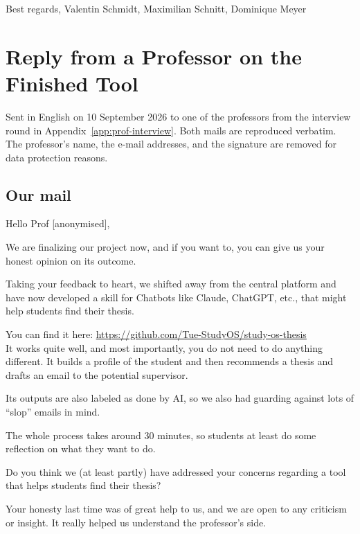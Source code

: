 \documentclass[11pt,a4paper]{article}
\begin{document}
\medskip
\noindent Best regards, Valentin Schmidt, Maximilian Schnitt, Dominique Meyer

\section{Reply from a Professor on the Finished Tool}
\label{app:prof-reply}

\noindent Sent in English on 10 September 2026 to one of the professors from the
interview round in Appendix~\ref{app:prof-interview}. Both mails are reproduced
verbatim. The professor's name, the e-mail addresses, and the signature are
removed for data protection reasons.

\subsection*{Our mail}

\noindent Hello Prof [anonymised],

\medskip
\noindent We are finalizing our project now, and if you want to, you can give us
your honest opinion on its outcome.

\medskip
\noindent Taking your feedback to heart, we shifted away from the central
platform and have now developed a skill for Chatbots like Claude, ChatGPT, etc.,
that might help students find their thesis.

\medskip
\noindent You can find it here: \url{https://github.com/Tue-StudyOS/study-os-thesis}\\
It works quite well, and most importantly, you do not need to do anything
different. It builds a profile of the student and then recommends a thesis and
drafts an email to the potential supervisor.

\medskip
\noindent Its outputs are also labeled as done by AI, so we also had guarding
against lots of ``slop'' emails in mind.

\medskip
\noindent The whole process takes around 30 minutes, so students at least do
some reflection on what they want to do.

\medskip
\noindent Do you think we (at least partly) have addressed your concerns
regarding a tool that helps students find their thesis?

\medskip
\noindent Your honesty last time was of great help to us, and we are open to any
criticism or insight. It really helped us understand the professor's side.
\end{document}
